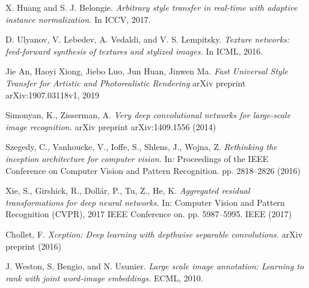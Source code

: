 \documentclass[10pt,twocolumn,letterpaper]{article}
\begin{document}
{\begin{thebibliography}{9}
X. Huang and S. J. Belongie.
\textit{Arbitrary style transfer in real-time with adaptive instance normalization.}
In ICCV, 2017.

D. Ulyanov, V. Lebedev, A. Vedaldi, and V. S. Lempitsky.
\textit{Texture networks: feed-forward synthesis of textures and stylized images.}
In ICML, 2016.

Jie An, Haoyi Xiong, Jiebo Luo, Jun Huan, Jinwen Ma.
\textit{Fast Universal Style Transfer for Artistic and Photorealistic Rendering}
arXiv preprint arXiv:1907.03118v1, 2019

Simonyan, K., Zisserman, A.
\textit{Very deep convolutional networks for large-scale image recognition.}
arXiv preprint arXiv:1409.1556 (2014)

Szegedy, C., Vanhoucke, V., Ioffe, S., Shlens, J., Wojna, Z.
\textit{Rethinking the inception architecture for computer vision.}
In: Proceedings of the IEEE Conference on Computer Vision and Pattern Recognition. pp. 2818–2826 (2016)

Xie, S., Girshick, R., Dollár, P., Tu, Z., He, K.
\textit{Aggregated residual transformations for deep neural networks.}
In: Computer Vision and Pattern Recognition (CVPR), 2017 IEEE Conference on. pp. 5987–5995. IEEE (2017)

Chollet, F.
\textit{Xception: Deep learning with depthwise separable convolutions.}
arXiv preprint (2016)

J. Weston, S. Bengio, and N. Usunier. 
\textit{Large scale image annotation: Learning to rank with joint word-image embeddings.}
ECML, 2010.
\end{thebibliography}
}
\end{document}

